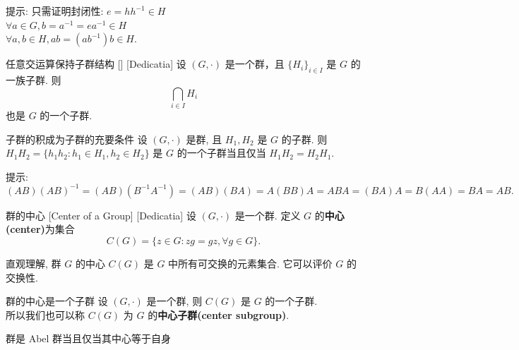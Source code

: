         \begin{prf}
            提示: 只需证明封闭性:
            \(e=hh^{-1}\in H\)\\
            \(\forall a\in G, b=a^{-1}=ea^{-1}\in H\)\\
            \(\forall a,b\in H, ab=(ab^{-1})b\in H\).
        \end{prf}

        \begin{ppt}
            {任意交运算保持子群结构}
            []
            [Dedicatia]
            设 \((G,\cdot)\) 是一个群，且 \(\{H_i\}_{i\in I}\) 是 \(G\) 的一族子群. 则
            \[\bigcap_{i\in I} H_i\]
            也是 \(G\) 的一个子群.
        \end{ppt}

        \begin{thm}
            {子群的积成为子群的充要条件}
            设 \((G,\cdot)\) 是群, 且 \(H_1,H_2\) 是 \(G\) 的子群. 则 \(H_1H_2=\{h_1h_2:h_1\in H_1,h_2\in H_2\}\) 是 \(G\) 的一个子群当且仅当 \(H_1H_2=H_2H_1\).
        \end{thm}

        \begin{prf}
            提示: 
            \[(AB)(AB)^{-1}=(AB)(B^{-1}A^{-1})=(AB)(BA)=A(BB)A=ABA=(BA)A=B(AA)=BA=AB.\]
        \end{prf}

        \begin{dfn}
            {群的中心}
            [Center of a Group]
            [Dedicatia]
            设 \((G,\cdot)\) 是一个群. 定义 \(G\) 的\textbf{中心(center)}为集合
            \[C(G)=\{z\in G: zg=gz, \forall g\in G\}.\]
        \end{dfn}

        \begin{rmk}
            直观理解, 群 \(G\) 的中心 \(C(G)\) 是 \(G\) 中所有可交换的元素集合. 它可以评价 \(G\) 的交换性. 
        \end{rmk}

        \begin{ppt}
            {群的中心是一个子群}
            设 \((G,\cdot)\) 是一个群, 则 \(C(G)\) 是 \(G\) 的一个子群.\\
            所以我们也可以称 \(C(G)\) 为 \(G\) 的\textbf{中心子群(center subgroup)}.
        \end{ppt}

        \begin{ppt}
            {群是 Abel 群当且仅当其中心等于自身}
        \end{ppt}


